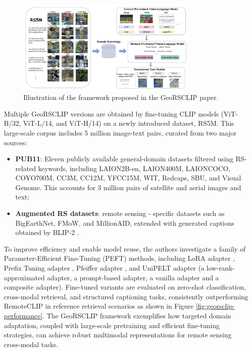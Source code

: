 \documentclass[a4paper, oneside, english]{sapthesis} %
\begin{document}
\begin{figure}[h]
    \centering
    \includegraphics[width=0.8\textwidth]{img/georsclip-framework.png}
    \caption{Illustration of the framework proposed in the GeoRSCLIP paper.}
    \label{fig:georsclip-framework}
\end{figure}

Multiple GeoRSCLIP versions are obtained by fine-tuning CLIP models (ViT-B/32, ViT-L/14, and ViT-H/14) on a newly introduced dataset, RS5M. This large-scale corpus includes 5 million image-text pairs, curated from two major sources:

\begin{itemize}
    \item \textbf{PUB11}: Eleven publicly available general-domain datasets filtered using RS-related keywords, including LAION2B-en, LAION400M, LAIONCOCO, COYO700M, CC3M, CC12M, YFCC15M, WIT, Redcaps, SBU, and Visual Genome. This accounts for 3 million pairs of satellite and aerial images and text;
    \item \textbf{Augmented RS datasets}: remote sensing - specific datasets such as BigEarthNet, FMoW, and MillionAID, extended with generated captions obtained by BLIP-2 \cite{li2023blip}.
\end{itemize}

To improve efficiency and enable model reuse, the authors investigate a family of Parameter-Efficient Fine-Tuning (PEFT) methods, including LoRA adapter \cite{hu2021loralowrankadaptationlarge}, Prefix Tuning adapter \cite{li2021prefix}, Pfeiffer adapter \cite{pfeiffer2020adapterfusion}, and UniPELT adapter \cite{mao2021unipelt} (a low-rank-approximated adapter, a prompt-based adapter, a vanilla adapter and a composite adapter). Fine-tuned variants are evaluated on zero-shot classification, cross-modal retrieval, and structured captioning tasks, consistently outperforming RemoteCLIP in reference retrieval scenarios as shown in Figure \ref{fig:georsclip-performance}. The GeoRSCLIP framework exemplifies how targeted domain adaptation, coupled with large-scale pretraining and efficient fine-tuning strategies, can achieve robust multimodal representations for remote sensing cross-modal tasks.
\end{document}
